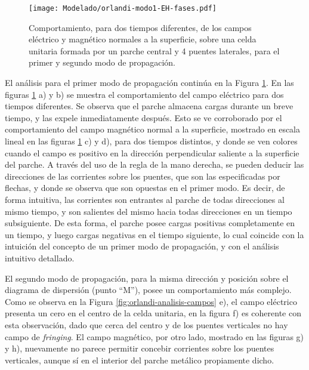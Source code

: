 \begin{figure}[h]
	\centering
	\texttt{[image: Modelado/orlandi-modo1-EH-fases.pdf]}
	\caption{Comportamiento, para dos tiempos diferentes, de los campos eléctrico y magnético normales a la superficie, sobre una celda unitaria formada por un parche central y 4 puentes laterales, para el primer y segundo modo de propagación.}
	\label{fig:orlandi-analisis-campos-fases}
\end{figure}

El análisis para el primer modo de propagación continúa en la Figura \ref{fig:orlandi-analisis-campos-fases}. En las figuras \ref{fig:orlandi-analisis-campos-fases} a) y b) se muestra el comportamiento del campo eléctrico para dos tiempos diferentes. Se observa que el parche almacena cargas durante un breve tiempo, y las expele inmediatamente después. Esto se ve corroborado por el comportamiento del campo magnético normal a la superficie, mostrado en escala lineal en las figuras \ref{fig:orlandi-analisis-campos-fases} c) y d), para dos tiempos distintos, y donde se ven colores cuando el campo es positivo en la dirección perpendicular saliente a la superficie del parche. A través del uso de la regla de la mano derecha, se pueden deducir las direcciones de las corrientes sobre los puentes, que son las especificadas por flechas, y donde se observa que son opuestas en el primer modo. Es decir, de forma intuitiva, las corrientes son entrantes al parche de todas direcciones al mismo tiempo, y son salientes del mismo hacia todas direcciones en un tiempo subsiguiente. De esta forma, el parche posee cargas positivas completamente en un tiempo, y luego cargas negativas en el tiempo siguiente, lo cual coincide con la intuición del concepto de un primer modo de propagación, y con el análisis intuitivo detallado.

El segundo modo de propagación, para la misma dirección y posición sobre el diagrama de dispersión (punto \enquote{M}), posee un comportamiento más complejo. Como se observa en la Figura \ref{fig:orlandi-analisis-campos} e), el campo eléctrico presenta un cero en el centro de la celda unitaria, en la figura f) es coherente con esta observación, dado que cerca del centro y de los puentes verticales no hay campo de \textit{fringing}. El campo magnético, por otro lado, mostrado en las figuras g) y h), nuevamente no parece permitir concebir corrientes sobre los puentes verticales, aunque sí en el interior del parche metálico propiamente dicho.

